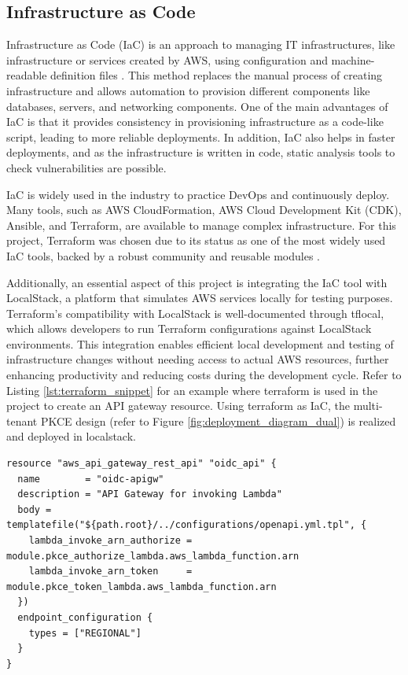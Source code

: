 \subsection{Infrastructure as Code}
Infrastructure as Code (IaC) is an approach to managing IT infrastructures, like infrastructure or services created by AWS, using configuration and machine-readable definition files \citep{iac}. This method replaces the manual process of creating infrastructure and allows automation to provision different components like databases, servers, and networking components. One of the main advantages of IaC is that it provides consistency in provisioning infrastructure as a code-like script, leading to more reliable deployments. In addition, IaC also helps in faster deployments, and as the infrastructure is written in code, static analysis tools to check vulnerabilities are possible.

IaC is widely used in the industry to practice DevOps and continuously deploy. Many tools, such as AWS CloudFormation, AWS Cloud Development Kit (CDK), Ansible, and Terraform, are available to manage complex infrastructure. For this project, Terraform was chosen due to its status as one of the most widely used IaC tools, backed by a robust community and reusable modules \citep{terraform}.

Additionally, an essential aspect of this project is integrating the IaC tool with LocalStack, a platform that simulates AWS services locally for testing purposes. Terraform's compatibility with LocalStack is well-documented through tflocal, which allows developers to run Terraform configurations against LocalStack environments. This integration enables efficient local development and testing of infrastructure changes without needing access to actual AWS resources, further enhancing productivity and reducing costs during the development cycle. Refer to Listing \ref{lst:terraform_snippet} for an example where terraform is used in the project to create an API gateway resource. Using terraform as IaC, the multi-tenant PKCE design (refer to Figure \ref{fig:deployment_diagram_dual}) is realized and deployed in localstack.

\begin{lstlisting}[caption={Terraform Code Snippet for API Gateway}, label={lst:terraform_snippet}]
resource "aws_api_gateway_rest_api" "oidc_api" {
  name        = "oidc-apigw"
  description = "API Gateway for invoking Lambda"
  body = templatefile("${path.root}/../configurations/openapi.yml.tpl", {
    lambda_invoke_arn_authorize = module.pkce_authorize_lambda.aws_lambda_function.arn
    lambda_invoke_arn_token     = module.pkce_token_lambda.aws_lambda_function.arn
  })
  endpoint_configuration {
    types = ["REGIONAL"]
  }
}
\end{lstlisting}

